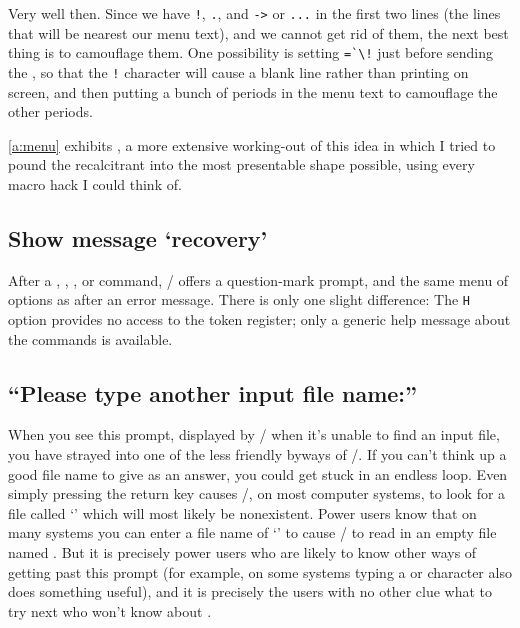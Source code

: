 {Very well then. Since we have \verb"!", \verb".", and \verb"->" or
\verb"..." in the first two lines (the lines that will be nearest our
menu text), and we cannot get rid of them, the next best thing is to
camouflage them. One possibility is setting
\verb"=`\!" just before sending the ,
so that the \verb"!" character will cause a blank line rather than
printing on screen, and then putting a bunch of periods in the menu
text to camouflage the other periods.

\ref{a:menu} exhibits , a more extensive
working-out of this idea in which I tried to pound the recalcitrant
 into the most presentable shape possible, using every
macro hack I could think of.

\subsection{Show message `recovery'}

After a , , , or 
command, \tex/ offers a question-mark prompt, and the same menu of
options as after an error message. There is only one slight
difference: The {\tt H} option provides no access to the 
token register; only a generic help message about the 
commands is available.

\subsection{``Please type another input file name:''}

When you see this prompt, displayed by \tex/ when it's unable to find
an input file, you have strayed into one of the less friendly byways
of \tex/. If you can't think up a good file name to give as an answer,
you could get stuck in an endless loop. Even simply pressing the {\sc
return} key causes \tex/, on most computer systems, to look for a file
called `' which will most likely be nonexistent.  Power users
know that on many systems you can enter a file name of `' to
cause \tex/ to read in an empty file named . But it is
precisely power users who are likely to know other ways of getting
past this prompt (for example, on some systems typing a  or
 character also does something useful), and it is precisely
the users with no other clue what to try next who won't know about
.

}
